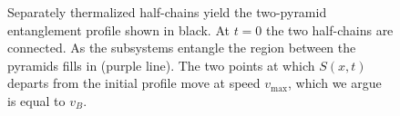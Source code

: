 \documentclass[aps,prx,twocolumn,superscriptaddress,floatfix,nofootinbib,prx]{revtex4}
\renewcommand{\>}{\right\rangle}
\newcommand{\<}{\left\langle}
\begin{document}
\begin{figure}[t]
\caption{
Separately thermalized half-chains yield the two-pyramid entanglement profile shown in black. At $t=0$ the two half-chains are connected.  As the subsystems entangle the region between the pyramids fills in (purple line).  The two points at which $S(x,t)$ departs from the initial profile move at speed $v_\text{max}$, which we argue is equal to $v_B$.
}  \label{fig:joiningprocess}
\end{figure}
\end{document}
